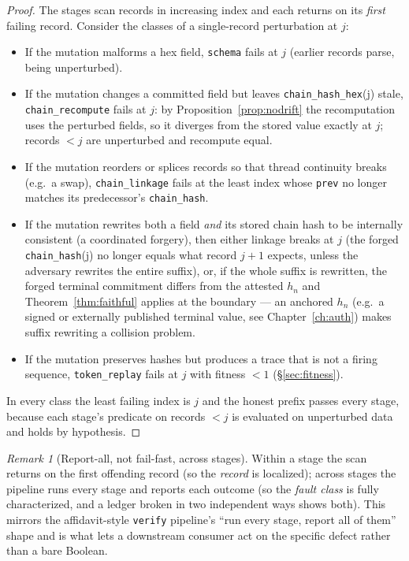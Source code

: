 \documentclass[11pt,oneside]{book}
\theoremstyle{definition}
\theoremstyle{plain}
\theoremstyle{remark}
\newtheorem*{remark}{Remark}
\newcommand{\code}[1]{\texttt{#1}}
\begin{document}
\begin{proof}
The stages scan records in increasing index and each returns on its \emph{first} failing
record. %
Consider the classes of a single-record perturbation at $j$: %
\begin{itemize}[leftmargin=*]
\item If the mutation malforms a hex field, \code{schema} fails at $j$ (earlier records parse,
being unperturbed). %
\item If the mutation changes a committed field but leaves \code{chain\_hash\_hex}(j) stale,
\code{chain\_recompute} fails at $j$: by Proposition~\ref{prop:nodrift} the recomputation uses
the perturbed fields, so it diverges from the stored value exactly at $j$; records $<j$ are
unperturbed and recompute equal. %
\item If the mutation reorders or splices records so that thread continuity breaks (e.g.\ a
swap), \code{chain\_linkage} fails at the least index whose \code{prev} no longer matches its
predecessor's \code{chain\_hash}. %
\item If the mutation rewrites both a field \emph{and} its stored chain hash to be internally
consistent (a coordinated forgery), then either linkage breaks at $j$ (the forged
\code{chain\_hash}(j) no longer equals what record $j{+}1$ expects, unless the adversary
rewrites the entire suffix), or, if the whole suffix is rewritten, the forged terminal
commitment differs from the attested $h_n$ and Theorem~\ref{thm:faithful} applies at the
boundary --- an anchored $h_n$ (e.g.\ a signed or externally published terminal value, see
Chapter~\ref{ch:auth}) makes suffix rewriting a collision problem. %
\item If the mutation preserves hashes but produces a trace that is not a firing sequence,
\code{token\_replay} fails at $j$ with fitness $<1$ (\S\ref{sec:fitness}). %
\end{itemize}
In every class the least failing index is $j$ and the honest prefix passes every stage,
because each stage's predicate on records $<j$ is evaluated on unperturbed data and holds by
hypothesis. %
 \end{proof}

\begin{remark}[Report-all, not fail-fast, across stages]
Within a stage the scan returns on the first offending record (so the \emph{record} is
localized); across stages the pipeline runs every stage and reports each outcome (so the
\emph{fault class} is fully characterized, and a ledger broken in two independent ways shows
both). %
This mirrors the affidavit-style \code{verify} pipeline's ``run every stage, report all
of them'' shape and is what lets a downstream consumer act on the specific defect rather than
a bare Boolean. %
\end{remark}
\end{document}
